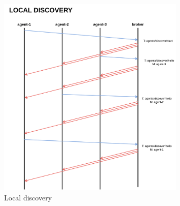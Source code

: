 \begin{figure}[H]
    \centering
    \includegraphics[width=0.8\textwidth]{pictures/local_discovery.png}
    \caption{ Local discovery }
    \label{fig:local_discovery}
\end{figure}
